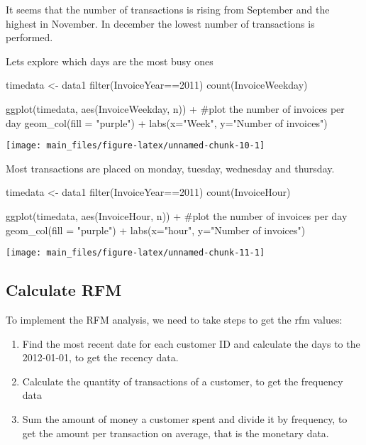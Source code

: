 It seems that the number of transactions is rising from September and
the highest in November. In december the lowest number of transactions
is performed.

Lets explore which days are the most busy ones

\begin{Schunk}
\begin{Sinput}
timedata <- data1 %>% 
  filter(InvoiceYear==2011) %>% 
  count(InvoiceWeekday)

ggplot(timedata, aes(InvoiceWeekday, n)) +  #plot the number of invoices per day               
    geom_col(fill = "purple") +
  labs(x="Week", y="Number of invoices") 
\end{Sinput}


\begin{center}\texttt{[image: main\_files/figure-latex/unnamed-chunk-10-1]} \end{center}

\end{Schunk}

Most transactions are placed on monday, tuesday, wednesday and thursday.

\begin{Schunk}
\begin{Sinput}
timedata <- data1 %>% 
 filter(InvoiceYear==2011) %>% 
  count(InvoiceHour)

ggplot(timedata, aes(InvoiceHour, n)) +  #plot the number of invoices per day               
    geom_col(fill = "purple") +
  labs(x="hour", y="Number of invoices") 
\end{Sinput}


\begin{center}\texttt{[image: main\_files/figure-latex/unnamed-chunk-11-1]} \end{center}

\end{Schunk}

\hypertarget{calculate-rfm}{%
\subsection{Calculate RFM}\label{calculate-rfm}}

To implement the RFM analysis, we need to take steps to get the rfm
values:

\begin{enumerate}
\def\labelenumi{\arabic{enumi}.}
\tightlist
\item
  Find the most recent date for each customer ID and calculate the days
  to the 2012-01-01, to get the recency data.
\item
  Calculate the quantity of transactions of a customer, to get the
  frequency data
\item
  Sum the amount of money a customer spent and divide it by frequency,
  to get the amount per transaction on average, that is the monetary
  data.
\end{enumerate}

